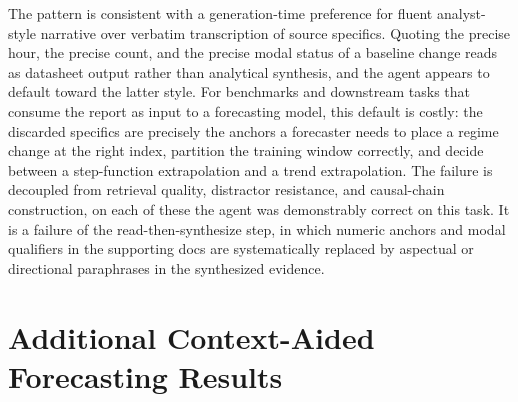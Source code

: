 \documentclass[]{servicenow}
\begin{document}
The pattern is consistent with a generation-time preference for fluent analyst-style narrative over verbatim transcription of source specifics. Quoting the precise hour, the precise count, and the precise modal status of a baseline change reads as datasheet output rather than analytical synthesis, and the agent appears to default toward the latter style. For benchmarks and downstream tasks that consume the report as input to a forecasting model, this default is costly: the discarded specifics are precisely the anchors a forecaster needs to place a regime change at the right index, partition the training window correctly, and decide between a step-function extrapolation and a trend extrapolation. The failure is decoupled from retrieval quality, distractor resistance, and causal-chain construction, on each of these the agent was demonstrably correct on this task. It is a failure of the read-then-synthesize step, in which numeric anchors and modal qualifiers in the supporting docs are systematically replaced by aspectual or directional paraphrases in the synthesized evidence.


\section{Additional Context-Aided Forecasting Results}
\label{appx:additional_caf_results}
\end{document}
